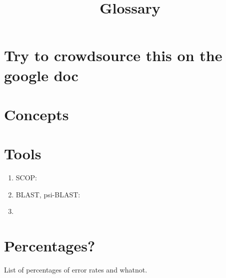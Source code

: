 \documentclass[11pt]{article}
\title{Glossary}
\author{\Name}%
\begin{document}
\maketitle

\section*{Try to crowdsource this on the google doc}

\section*{Concepts}

\section*{Tools}
\begin{enumerate}
\item SCOP: 
\item BLAST, psi-BLAST: 
\item 
\end{enumerate}

\section*{Percentages?}

List of percentages of error rates and whatnot.
\end{document}
